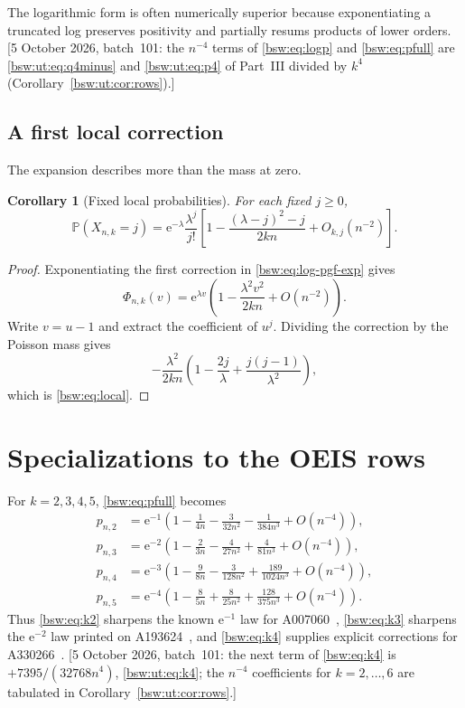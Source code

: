 \documentclass[11pt,letterpaper]{article}
\newtheorem{corollary}[theorem]{Corollary}
\theoremstyle{definition}
\theoremstyle{remark}
\newcommand{\PP}{\mathbb P}
\newcommand{\ee}{\mathrm e}
\begin{document}
The logarithmic form is often numerically superior because exponentiating a
truncated log preserves positivity and partially resums products of lower
orders.
[5 October 2026, batch~101: the $n^{-4}$ terms of \eqref{bsw:eq:logp} and
\eqref{bsw:eq:pfull} are \eqref{bsw:ut:eq:q4minus} and
\eqref{bsw:ut:eq:p4} of Part~III divided by $k^4$
(Corollary~\ref{bsw:ut:cor:rows}).]

\subsection{A first local correction}

The expansion describes more than the mass at zero.

\begin{corollary}[Fixed local probabilities]\label{bsw:cor:local}
For each fixed $j\ge0$,
\begin{equation}\label{bsw:eq:local}
 \PP(X_{n,k}=j)
 =\ee^{-\lambda}\frac{\lambda^j}{j!}
 \left[1-\frac{(\lambda-j)^2-j}{2kn}+O_{k,j}(n^{-2})\right].
\end{equation}
\end{corollary}

\begin{proof}
Exponentiating the first correction in \eqref{bsw:eq:log-pgf-exp} gives
\[
 \Phi_{n,k}(v)=\ee^{\lambda v}
 \left(1-\frac{\lambda^2v^2}{2kn}+O(n^{-2})\right).
\]
Write $v=u-1$ and extract the coefficient of $u^j$.  Dividing the correction
by the Poisson mass gives
\[
 -\frac{\lambda^2}{2kn}
 \left(1-\frac{2j}{\lambda}+\frac{j(j-1)}{\lambda^2}\right),
\]
which is \eqref{bsw:eq:local}.
\end{proof}

\section{Specializations to the OEIS rows}

For $k=2,3,4,5$, \eqref{bsw:eq:pfull} becomes
\begin{align}
 p_{n,2}&=\ee^{-1}\left(1-\frac1{4n}-\frac3{32n^2}
 -\frac1{384n^3}+O(n^{-4})\right),\label{bsw:eq:k2}\\
 p_{n,3}&=\ee^{-2}\left(1-\frac2{3n}-\frac4{27n^2}
 +\frac4{81n^3}+O(n^{-4})\right),\label{bsw:eq:k3}\\
 p_{n,4}&=\ee^{-3}\left(1-\frac9{8n}-\frac3{128n^2}
 +\frac{189}{1024n^3}+O(n^{-4})\right),\label{bsw:eq:k4}\\
 p_{n,5}&=\ee^{-4}\left(1-\frac8{5n}+\frac8{25n^2}
 +\frac{128}{375n^3}+O(n^{-4})\right).
\label{bsw:eq:k5}
\end{align}
Thus \eqref{bsw:eq:k2} sharpens the known $\ee^{-1}$ law for
A007060~\cite{oeis007060}, \eqref{bsw:eq:k3} sharpens the $\ee^{-2}$ law
printed on A193624~\cite{oeis193624}, and \eqref{bsw:eq:k4} supplies explicit
corrections for A330266~\cite{oeis330266}.
[5 October 2026, batch~101: the next term of \eqref{bsw:eq:k4} is
$+7395/(32768n^4)$, \eqref{bsw:ut:eq:k4}; the $n^{-4}$ coefficients for
$k=2,\ldots,6$ are tabulated in Corollary~\ref{bsw:ut:cor:rows}.]
\end{document}
